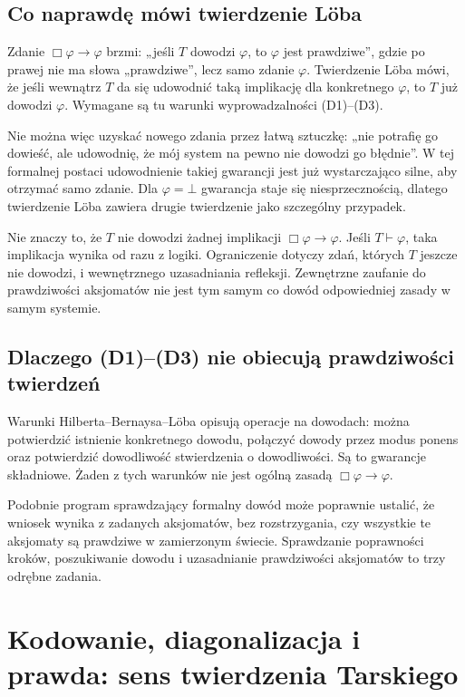 \documentclass[11pt,a4paper]{article}
\numberwithin{equation}{section}
\theoremstyle{plain}
\theoremstyle{definition}
\theoremstyle{remark}
\begin{document}
\subsection*{Co naprawdę mówi twierdzenie Löba}\label{sec:17:3}
Zdanie $\Box\varphi\to\varphi$ brzmi: „jeśli $T$ dowodzi $\varphi$, to $\varphi$ jest prawdziwe”, gdzie po prawej nie ma słowa „prawdziwe”, lecz samo zdanie $\varphi$. Twierdzenie Löba mówi, że jeśli wewnątrz $T$ da się udowodnić taką implikację dla konkretnego $\varphi$, to $T$ już dowodzi $\varphi$. Wymagane są tu warunki wyprowadzalności (D1)--(D3).

Nie można więc uzyskać nowego zdania przez łatwą sztuczkę: „nie potrafię go dowieść, ale udowodnię, że mój system na pewno nie dowodzi go błędnie”. W tej formalnej postaci udowodnienie takiej gwarancji jest już wystarczająco silne, aby otrzymać samo zdanie. Dla $\varphi=\bot$ gwarancja staje się niesprzecznością, dlatego twierdzenie Löba zawiera drugie twierdzenie jako szczególny przypadek.

Nie znaczy to, że $T$ nie dowodzi żadnej implikacji $\Box\varphi\to\varphi$. Jeśli $T\vdash\varphi$, taka implikacja wynika od razu z logiki. Ograniczenie dotyczy zdań, których $T$ jeszcze nie dowodzi, i wewnętrznego uzasadniania refleksji. Zewnętrzne zaufanie do prawdziwości aksjomatów nie jest tym samym co dowód odpowiedniej zasady w samym systemie.

\subsection*{Dlaczego (D1)--(D3) nie obiecują prawdziwości twierdzeń}\label{sec:17:4}
Warunki Hilberta--Bernaysa--Löba opisują operacje na dowodach: można potwierdzić istnienie konkretnego dowodu, połączyć dowody przez modus ponens oraz potwierdzić dowodliwość stwierdzenia o dowodliwości. Są to gwarancje składniowe. Żaden z tych warunków nie jest ogólną zasadą $\Box\varphi\to\varphi$.

Podobnie program sprawdzający formalny dowód może poprawnie ustalić, że wniosek wynika z zadanych aksjomatów, bez rozstrzygania, czy wszystkie te aksjomaty są prawdziwe w zamierzonym świecie. Sprawdzanie poprawności kroków, poszukiwanie dowodu i uzasadnianie prawdziwości aksjomatów to trzy odrębne zadania.

\section{Kodowanie, diagonalizacja i prawda: sens twierdzenia Tarskiego}\label{sec:sens-tarski}
\end{document}

